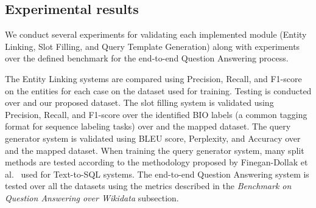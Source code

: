 \subsection*{Experimental results}
\label{cap1:intro/contributions/expResults}
We conduct several experiments for validating each implemented module (Entity Linking, 
Slot Filling, and Query Template Generation) along with experiments over the defined 
benchmark for the end-to-end Question Answering process.

The Entity Linking systems are compared using Precision, Recall, and F1-score on the 
entities for each case on the dataset used for training. Testing is conducted over \QALDseven{} and 
our proposed dataset. The slot filling system is validated using Precision, Recall, and F1-score 
over the identified BIO labels (a common tagging format for sequence labeling tasks) over 
\LCQuADtwo{} and the mapped \DBNQA{} dataset. The query generator system is validated 
using BLEU score, Perplexity, and Accuracy over \LCQuADtwo{} and the mapped \DBNQA{} 
dataset. When training the query generator system, many split methods are tested according 
to the methodology proposed by Finegan-Dollak et al.~\cite{semPar:txt-to-sql-RadevKZZFRS18} used for Text-to-SQL systems. 
The end-to-end Question Answering system is tested over all the datasets using the metrics 
described in the \textit{Benchmark on Question Answering over Wikidata} subsection.